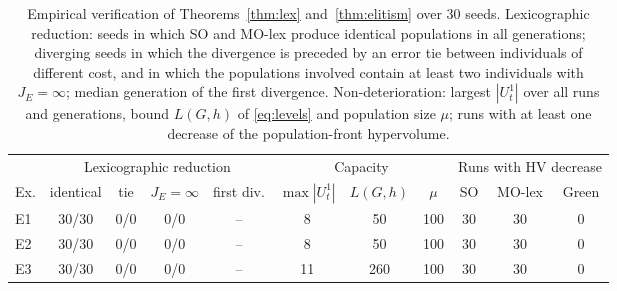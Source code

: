 \begin{table}[t]
\centering
\caption{Empirical verification of Theorems~\ref{thm:lex} and~\ref{thm:elitism} over 30 seeds. Lexicographic reduction: seeds in which SO and MO-lex produce identical populations in all generations; diverging seeds in which the divergence is preceded by an error tie between individuals of different cost, and in which the populations involved contain at least two individuals with $J_E=\infty$; median generation of the first divergence. Non-deterioration: largest $|U_t^1|$ over all runs and generations, bound $L(G,h)$ of \eqref{eq:levels} and population size $\mu$; runs with at least one decrease of the population-front hypervolume.}
\label{tab:checks_K}
\small
\setlength{\tabcolsep}{4pt}
\begin{tabular}{lcccccccccc}
\toprule
 & \multicolumn{4}{c}{Lexicographic reduction} & \multicolumn{3}{c}{Capacity} & \multicolumn{3}{c}{Runs with HV decrease} \\
\cmidrule(lr){2-5}\cmidrule(lr){6-8}\cmidrule(lr){9-11}
Ex. & identical & tie & $J_E{=}\infty$ & first div. & $\max|U_t^1|$ & $L(G,h)$ & $\mu$ & SO & MO-lex & Green \\
\midrule
E1 & 30/30 & 0/0 & 0/0 & -- & 8 & 50 & 100 & 30 & 30 & 0 \\
E2 & 30/30 & 0/0 & 0/0 & -- & 8 & 50 & 100 & 30 & 30 & 0 \\
E3 & 30/30 & 0/0 & 0/0 & -- & 11 & 260 & 100 & 30 & 30 & 0 \\
\bottomrule
\end{tabular}
\end{table}
